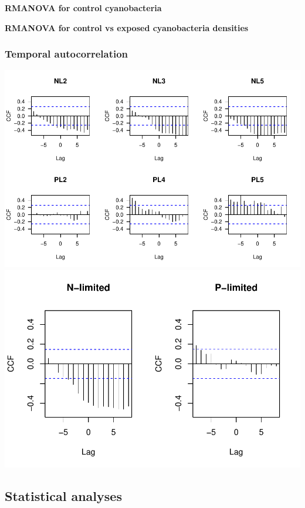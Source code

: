 \documentclass[]{article}
\begin{document}
\textbf{RMANOVA for control cyanobacteria}

\textbf{RMANOVA for control vs exposed cyanobacteria densities}

\newpage

\subsubsection{Temporal autocorrelation}\label{temporal-autocorrelation}

\includegraphics{analysis_ecoevostoich_files/figure-latex/unnamed-chunk-11-1.pdf}
\includegraphics{analysis_ecoevostoich_files/figure-latex/unnamed-chunk-11-2.pdf}

\newpage

\subsection{Statistical analyses}\label{statistical-analyses}
\end{document}
